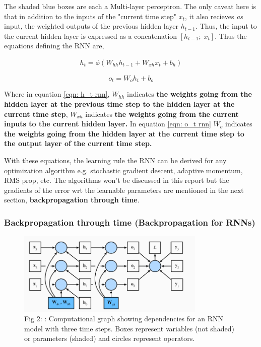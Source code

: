 \documentclass[12pt, letterpaper]{article}
\begin{document}
The shaded blue boxes are each a Multi-layer perceptron. The only caveat here is that in addition to the
inputs of the "current time step" $x_t$, it also recieves \textit{as} input, the weighted outputs of 
the previous hidden layer $h_{t-1}$. Thus, the input to the current hidden layer is expressed as a 
concatenation $[h_{t-1};\;x_t]$. Thus the equations defining the RNN are,

\begin{align}
    h_t = \phi(W_{hh} h_{t-1} + W_{xh} x_t + b_h)
    \label{eqn: h_t rnn}
\end{align}

\begin{equation}
    o_t = W_o h_t + b_o
    \label{eqn: o_t rnn}
\end{equation}

Where in equation \ref{eqn: h_t rnn}, $W_{hh}$ indicates \textbf{the weights going from the hidden layer at the previous time step to the 
hidden layer at the current time step}, $W_{xh}$ indicates \textbf{the weights going from the current 
inputs to the current hidden layer.} In equation \ref{eqn: o_t rnn} $W_o$ indicates \textbf{the weights going from
the hidden layer at the current time step to the output layer of the current time step.}

With these equations, the learning rule the RNN can be derived for any optimization algorithm e.g.
stochastic gradient descent, adaptive momentum, RMS prop, etc. The algorithms won't be discussed in 
this report but the gradients of the error wrt the learnable parameters are mentioned
in the next section, \textbf{backpropagation through time}.

\subsubsection{Backpropagation through time (Backpropagation for RNNs)}

\begin{figure}[htpb]
    \centering
    \includegraphics[width=0.8\textwidth]{d2l_ai_rnn_v2.png}
    \caption{Fig 2: \cite{zhang2023dive}: Computational graph showing dependencies for an RNN model 
    with three time steps. Boxes represent variables (not shaded) or parameters (shaded) and circles 
    represent operators.}
    \label{fig: rnns v2}
\end{figure}
\end{document}
